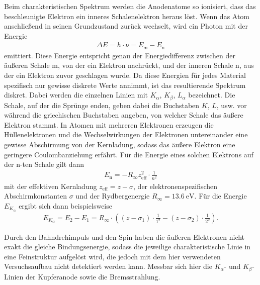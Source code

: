 \noindent
Beim charakteristischen Spektrum werden die Anodenatome so ionisiert, dass das beschleunigte Elektron 
ein inneres Schalenelektron heraus löst. 
Wenn das Atom anschließend in seinen Grundzustand zurück wechselt, wird ein Photon mit der Energie 
\begin{align}
    \Delta E = h \cdot \nu = E_\text{m} - E_\text{n}
    \label{eq:energiedifferenz}
\end{align}
emittiert.
Diese Energie entspricht genau der Energiedifferenz zwischen der äußeren Schale m, von der ein Elektron nachrückt, und der inneren Schale n,
aus der ein Elektron zuvor geschlagen wurde. 
Da diese Energien für jedes Material spezifisch nur gewisse diskrete Werte annimmt, ist das resultierende Spektrum diskret.
Dabei werden die einzelnen Linien mit $K_\alpha$, $K_\beta$, $L_\alpha$ bezeichnet.
Die Schale, auf der die Sprünge enden, geben dabei die Buchstaben $K$, $L$, usw. vor während die griechischen Buchstaben angeben, von welcher Schale das 
äußere Elektron stammt.
In Atomen mit mehreren Elektronen erzeugen die Hüllenelektronen und die Wechselwirkungen der Elektronen untereinander eine gewisse Abschirmung von der Kernladung,
sodass das äußere Elektron eine geringere Coulombanziehung erfährt.
Für die Energie eines solchen Elektrons auf der n-ten Schale gilt dann
\begin{align}
    E_\text{n} = - R_\infty z_\text{eff}^2 \cdot \frac{1}{n^2}
    \label{eq:effektive_energie}
\end{align}
mit der effektiven Kernladung $z_\text{eff} = z - \sigma$, der elektronenspezifischen Abschirmkonstanten $\sigma$ und der Rydbergenergie $R_\infty = \qty[]{13.6}{\electronvolt}$.
Für die Energie $E_{K_\alpha}$ ergibt sich dann beispielsweise
\begin{align}
    E_{K_\alpha} = E_2 - E_1 = R_\infty \cdot \left(\left(z-\sigma_1\right) \cdot \frac{1}{1^2} - \left(z-\sigma_2\right) \cdot \frac{1}{2^2}\right).
    \label{eq:k_alpha}
\end{align}

\noindent
Durch den Bahndrehimpuls und den Spin haben die äußeren Elektronen nicht exakt die gleiche Bindungsenergie, sodass die jeweilige charakteristische Linie in eine
Feinstruktur aufgelöst wird, die jedoch mit dem hier verwendeten Versuchsaufbau nicht detektiert werden kann.
Messbar sich hier die $K_\alpha$- und $K_\beta$-Linien der Kupferanode sowie die Bremsstrahlung.





